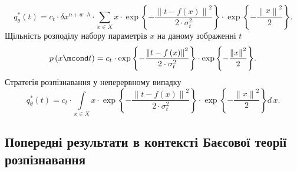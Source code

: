 \begin{equation*}
  q^*_{\theta}\left( t \right)
  = c_t \cdot \delta x^{n + w \cdot h}
    \cdot \sum_{x \in X}
      x
      \cdot \exp{\left\{ - \frac{\left\| t - f\left( x \right) \right\|^2}
                                {2 \cdot \sigma_t^2} \right\}}
      \cdot \exp{\left\{ - \frac{\left\| x \right\|^2}{2} \right\}}.
\end{equation*}
Щільність розподілу набору параметрів $x$ на даному зображенні $t$
\begin{equation*}
  p\left( x \mcond t \right)
  = c_t
    \cdot \exp{\left\{ - \frac{\left\| t - f\left( x \right) \right\|^2}
                              {2 \cdot \sigma_t^2} \right\}}
    \cdot \exp{\left\{ - \frac{\left\| x \right\|^2}{2} \right\}}.
\end{equation*}
Стратегія розпізнавання у неперервному випадку
\begin{equation*}
  q^*_{\theta}\left( t \right)
  = c_t
    \cdot \int\limits_{x \in X}
      x
      \cdot \exp{\left\{ - \frac{\left\| t - f\left( x \right) \right\|^2}
                                {2 \cdot \sigma_t^2} \right\}}
      \cdot \exp{\left\{ - \frac{\left\| x \right\|^2}{2} \right\}}
    d\,x.
\end{equation*}

\subsection{Попередні результати в контексті Баєсової теорії розпізнавання}

